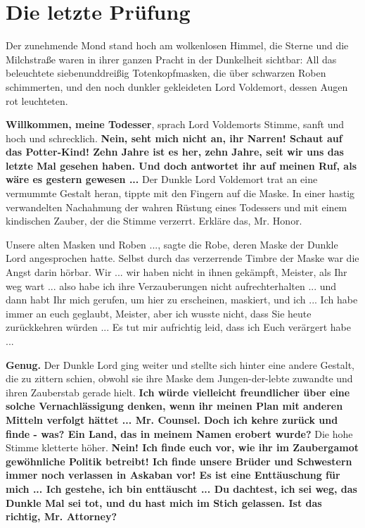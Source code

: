 \chapter{Die letzte Prüfung}

Der zunehmende Mond stand hoch am wolkenlosen Himmel, die Sterne und die
Milchstraße waren in ihrer ganzen Pracht in der Dunkelheit sichtbar: All das
beleuchtete siebenunddreißig Totenkopfmasken, die über schwarzen Roben
schimmerten, und den noch dunkler gekleideten Lord Voldemort, dessen Augen rot
leuchteten.

\glqq{}\textbf{Willkommen, meine Todesser}\grqq{}, sprach Lord Voldemorts Stimme,
sanft und hoch und schrecklich. \glqq{}\textbf{Nein, seht mich nicht an, ihr
Narren! Schaut auf das Potter-Kind! Zehn Jahre ist es her, zehn Jahre, seit wir
uns das letzte Mal gesehen haben. Und doch antwortet ihr auf meinen Ruf, als
wäre es gestern gewesen ...}\grqq{} Der Dunkle Lord Voldemort trat an eine vermummte
Gestalt heran, tippte mit den Fingern auf die Maske. \glqq{}In einer hastig
verwandelten Nachahmung der wahren Rüstung eines Todessers und mit einem
kindischen Zauber, der die Stimme verzerrt. Erkläre das, Mr. Honor.\grqq{}

\glqq{}Unsere alten Masken und Roben ...\grqq{}, sagte die Robe, deren Maske der
Dunkle Lord angesprochen hatte. Selbst durch das verzerrende Timbre der Maske
war die Angst darin hörbar. \glqq{}Wir ... wir haben nicht in ihnen gekämpft,
Meister, als Ihr weg wart ... also habe ich ihre Verzauberungen nicht
aufrechterhalten ... und dann habt Ihr mich gerufen, um hier zu erscheinen,
maskiert, und ich ... Ich habe immer an euch geglaubt, Meister, aber ich wusste
nicht, dass Sie heute zurückkehren würden ... Es tut mir aufrichtig leid, dass
ich Euch verärgert habe ...\grqq{}

\glqq{}\textbf{Genug.}\grqq{} Der Dunkle Lord ging weiter und stellte sich hinter eine
andere Gestalt, die zu zittern schien, obwohl sie ihre Maske dem
Jungen-der-lebte zuwandte und ihren Zauberstab gerade hielt. \glqq{}\textbf{Ich
würde vielleicht freundlicher über eine solche Vernachlässigung denken, wenn ihr
meinen Plan mit anderen Mitteln verfolgt hättet ... Mr. Counsel. Doch ich kehre
zurück und finde - was? Ein Land, das in meinem Namen erobert wurde?}\grqq{} Die hohe
Stimme kletterte höher. \glqq{}\textbf{Nein! Ich finde euch vor, wie ihr im
Zaubergamot gewöhnliche Politik betreibt! Ich finde unsere Brüder und Schwestern
immer noch verlassen in Askaban vor! Es ist eine Enttäuschung für mich ... Ich
gestehe, ich bin enttäuscht ... Du dachtest, ich sei weg, das Dunkle Mal sei tot,
und du hast mich im Stich gelassen. Ist das richtig, Mr. Attorney?}\grqq{}

